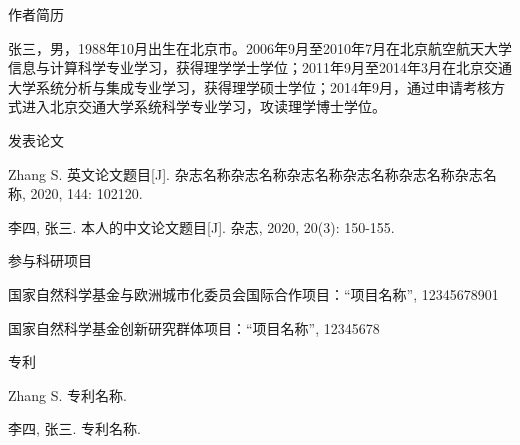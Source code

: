 \begin{ResumePublications}
	\begin{ResumeList}
		\item 作者简历\par
		张三，男，1988年10月出生在北京市。2006年9月至2010年7月在北京航空航天大学信息与计算科学专业学习，获得理学学士学位；2011年9月至2014年3月在北京交通大学系统分析与集成专业学习，获得理学硕士学位；2014年9月，通过申请考核方式进入北京交通大学系统科学专业学习，攻读理学博士学位。	
		\item 发表论文
		\begin{PublicationsList}
			\item Zhang S. 英文论文题目\hspace{0em}[J]. 杂志名称杂志名称杂志名称杂志名称杂志名称杂志名称, 2020, 144: 102120.
			\item 李四, 张三. 本人的中文论文题目\hspace{0em}[J]. 杂志, 2020, 20(3): 150-155.
		\end{PublicationsList}
		\item 参与科研项目
		\begin{PublicationsList}
			\item 国家自然科学基金与欧洲城市化委员会国际合作项目：“项目名称”, 12345678901
			\item 国家自然科学基金创新研究群体项目：“项目名称”, 12345678
		\end{PublicationsList}
		\item 专利
		\begin{PublicationsList}
			\item Zhang S.  专利名称.
			\item 李四, 张三. 专利名称.
		\end{PublicationsList}
	\end{ResumeList}
\end{ResumePublications}

